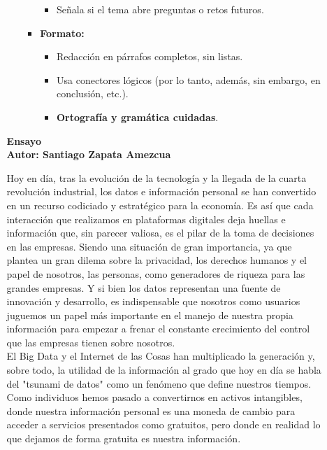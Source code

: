 \documentclass[12pt]{report}
\begin{document}
\begin{enumerate}[label=\textbf{\arabic*.}, leftmargin=*]
\begin{enumerate}[label=\textbf{\alph*.}, leftmargin=*, itemsep=1.0em]
\begin{itemize}
\begin{itemize}
\begin{itemize}
      \item Se\~nala si el tema abre preguntas o retos futuros.
    \end{itemize}
    \item \textbf{Formato:}
    \begin{itemize}
      \item Redacci\'on en p\'arrafos completos, sin listas.
      \item Usa conectores l\'ogicos (por lo tanto, adem\'as, sin embargo, en conclusi\'on, etc.).
      \item \textbf{Ortograf\'ia y gram\'atica cuidadas}.
    \end{itemize}
  \end{itemize}
\end{itemize}



\newpage
\textbf{Ensayo\\
Autor: Santiago Zapata Amezcua}

Hoy en día, tras la evolución de la tecnología y la llegada de la cuarta revolución industrial, los datos e información personal se han convertido en un recurso codiciado y estratégico para la economía. Es así que cada interacción que realizamos en plataformas digitales deja huellas e información que, sin parecer valiosa, es el pilar de la toma de decisiones en las empresas. Siendo una situación de gran importancia, ya que plantea un gran dilema sobre la privacidad, los derechos humanos y el papel de nosotros, las personas, como generadores de riqueza para las grandes empresas. Y si bien los datos representan una fuente de innovación y desarrollo, es indispensable que nosotros como usuarios juguemos un papel más importante en el manejo de nuestra propia información para empezar a frenar el constante crecimiento del control que las empresas tienen sobre nosotros.\\

El Big Data y el Internet de las Cosas han multiplicado la generación y, sobre todo, la utilidad de la información al grado que hoy en día se habla del "tsunami de datos" como un fenómeno que define nuestros tiempos. Como individuos hemos pasado a convertirnos en activos intangibles, donde nuestra información personal es una moneda de cambio para acceder a servicios presentados como gratuitos, pero donde en realidad lo que dejamos de forma gratuita es nuestra información.\\


\end{enumerate}
\end{enumerate}
\end{document}
